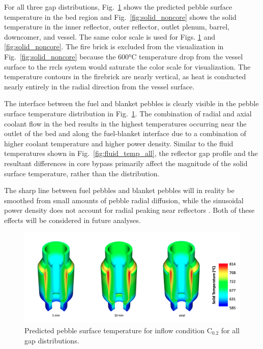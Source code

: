 For all three gap distributions, Fig.\ \ref{fig:solid_core} shows the predicted pebble surface temperature in the bed region and Fig.\ \ref{fig:solid_noncore} shows the solid temperature in the inner reflector, outer reflector, outlet plenum, barrel, downcomer, and vessel. The same color scale is used for Figs. \ref{fig:solid_core} and \ref{fig:solid_noncore}. The fire brick is excluded from the visualization in Fig.\ \ref{fig:solid_noncore} because the 600\si{\celsius} temperature drop from the vessel surface to the \gls{rrcls} system would saturate the color scale for visualization. The temperature contours in the firebrick are nearly vertical, as heat is conducted nearly entirely in the radial direction from the vessel surface.

The interface between the fuel and blanket pebbles is clearly visible in the pebble surface temperature distribution in Fig.\ \ref{fig:solid_core}. The combination of radial and axial coolant flow in the bed results in the highest temperatures occurring near the outlet of the bed and along the fuel-blanket interface due to a combination of higher coolant temperature and higher power density. Similar to the fluid temperatures shown in Fig.\ \ref{fig:fluid_temp_all}, the reflector gap profile and the resultant differences in core bypass primarily affect the magnitude of the solid surface temperature, rather than the distribution. 

The sharp line between fuel pebbles and blanket pebbles will in reality be smoothed from small amounts of pebble radial diffusion, while the sinusoidal power density does not account for radial peaking near reflectors \cite{xin_wang_thesis}. Both of these effects will be considered in future analyses.

\begin{figure}[h!]
\centering
\includegraphics[height=0.4\linewidth]{figs/solid_temp_core.png}
\caption{Predicted pebble surface temperature for inflow condition C$_\text{0.2}$ for all gap distributions.}
\label{fig:solid_core}
\end{figure}

